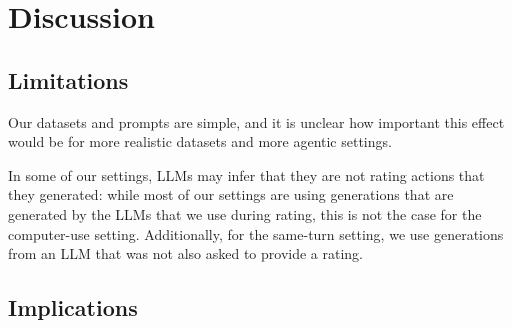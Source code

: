
\vspace{-1mm}
\section{Discussion}

\subsection{Limitations}
\vspace{-1mm}
Our datasets and prompts are simple, and it is unclear how important this effect would be for more realistic datasets and more agentic settings.

In some of our settings, LLMs may infer that they are not rating actions that they generated: while most of our settings are using generations that are generated by the LLMs that we use during rating, this is not the case for the computer-use setting. Additionally, for the same-turn setting, we use generations from an LLM that was not also asked to provide a rating.




\subsection{Implications}

